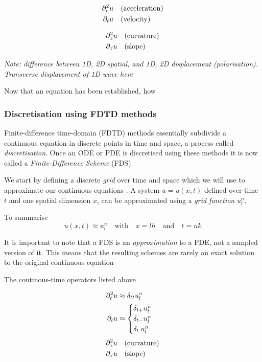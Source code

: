 \begin{minipage}[c]{0.49\textwidth}
    \begin{align*}
        \partial_t^2 u &\quad \text{(acceleration)}\\
        \partial_t u &\quad \text{(velocity)}
    \end{align*}
\end{minipage}
\begin{minipage}[c]{0.49\textwidth}
    \begin{align*}
    \partial_x^2 u &\quad \text{(curvature)}\\
    \partial_x u &\quad \text{(slope)}
    \end{align*}
\end{minipage}

\textit{Note: difference between 1D, 2D spatial, and 1D, 2D displacement (polarisation). Transverse displacement of 1D wave here }

Now that an equation has been established, how 


\subsubsection{Discretisation using FDTD methods}
Finite-difference time-domain (FDTD) methods essentially subdivide a continuous equation in discrete points in time and space, a process called \textit{discretisation}. Once an ODE or PDE is discretised using these methods it is now called a \textit{Finite-Difference Scheme} (FDS).

We start by defining a discrete \textit{grid} over time and space which we will use to approximate our continuous equations . A system $u = u(x,t)$ defined over time $t$ and one spatial dimension $x$, can be approximated using a \textit{grid function} $u_l^n$.

To summarise
\begin{equation}
    u(x,t) \approx u_l^n \quad \text{with} \quad x=lh \quad \text{and} \quad t = nk
\end{equation}


It is important to note that a FDS is an \textit{approximation} to a PDE, not a sampled version of it. This means that the resulting schemes are rarely an exact solution to the original continuous equation 

The continous-time operators listed above 

\begin{align*}
    \partial_t^2 u & \approx \delta_{tt} u_l^n\\
    \partial_t u &\approx 
    \begin{cases}
        \delta_{t+} u_l^n\\
        \delta_{t-} u_l^n\\
        \delta_{t\cdot} u_l^n\\
    \end{cases}
\end{align*}
\begin{align*}
    \partial_x^2 u &\quad \text{(curvature)}\\
    \partial_x u &\quad \text{(slope)}
\end{align*}


